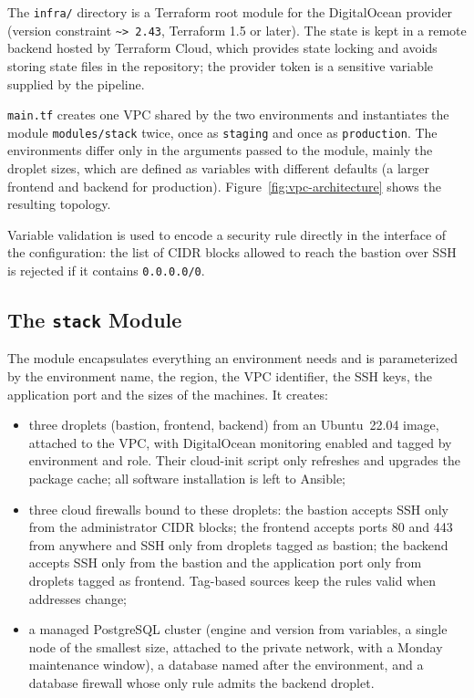 The \texttt{infra/} directory is a Terraform root module for the DigitalOcean provider (version constraint \texttt{\textasciitilde{}> 2.43}, Terraform 1.5 or later). The state is kept in a remote backend hosted by Terraform Cloud, which provides state locking and avoids storing state files in the repository; the provider token is a sensitive variable supplied by the pipeline.

\texttt{main.tf} creates one VPC shared by the two environments and instantiates the module \texttt{modules/stack} twice, once as \texttt{staging} and once as \texttt{production}. The environments differ only in the arguments passed to the module, mainly the droplet sizes, which are defined as variables with different defaults (a larger frontend and backend for production). Figure~\ref{fig:vpc-architecture} shows the resulting topology.




Variable validation is used to encode a security rule directly in the interface of the configuration: the list of CIDR blocks allowed to reach the bastion over SSH is rejected if it contains \texttt{0.0.0.0/0}.


\subsection{The \texttt{stack} Module}

The module encapsulates everything an environment needs and is parameterized by the environment name, the region, the VPC identifier, the SSH keys, the application port and the sizes of the machines. It creates:
\begin{itemize}
  \item three droplets (bastion, frontend, backend) from an Ubuntu~22.04 image, attached to the VPC, with DigitalOcean monitoring enabled and tagged by environment and role. Their cloud-init script only refreshes and upgrades the package cache; all software installation is left to Ansible;
  \item three cloud firewalls bound to these droplets: the bastion accepts SSH only from the administrator CIDR blocks; the frontend accepts ports 80 and 443 from anywhere and SSH only from droplets tagged as bastion; the backend accepts SSH only from the bastion and the application port only from droplets tagged as frontend. Tag-based sources keep the rules valid when addresses change;
  \item a managed PostgreSQL cluster (engine and version from variables, a single node of the smallest size, attached to the private network, with a Monday maintenance window), a database named after the environment, and a database firewall whose only rule admits the backend droplet.
\end{itemize}


